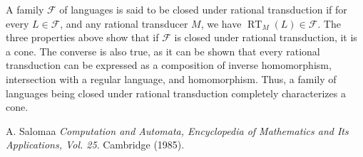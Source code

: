 \documentclass[12pt]{article}
\begin{document}
A family $\mathscr{F}$ of languages is said to be closed under rational transduction if for every $L\in \mathscr{F}$, and any rational transducer $M$, we have $\operatorname{RT}_M(L)\in \mathscr{F}$.  The three properties above show that if $\mathscr{F}$ is closed under rational transduction, it is a cone.  The converse is also true, as it can be shown that every rational transduction can be expressed as a composition of inverse homomorphism, intersection with a regular language, and homomorphism.  Thus, a family of languages being closed under rational transduction completely characterizes a cone.

\begin{thebibliography}{9}
 A. Salomaa {\em Computation and Automata, Encyclopedia of Mathematics and Its Applications, Vol. 25}. Cambridge (1985).
\end{thebibliography}
\end{document}
